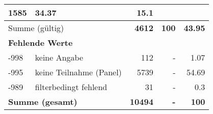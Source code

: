 \begin{longtable}{lXrrr}
       \num{1585} &
       \num[round-mode=places,round-precision=2]{34.37} &
         \num[round-mode=places,round-precision=2]{15.1} \\
     \midrule
     \multicolumn{2}{l}{Summe (gültig)} &
       \textbf{\num{4612}} &
     \textbf{\num{100}} &
       \textbf{\num[round-mode=places,round-precision=2]{43.95}} \\
     \multicolumn{5}{l}{\textbf{Fehlende Werte}}\\
       -998 &
       keine Angabe &
         \num{112} &
        - &
         \num[round-mode=places,round-precision=2]{1.07} \\
       -995 &
       keine Teilnahme (Panel) &
         \num{5739} &
        - &
         \num[round-mode=places,round-precision=2]{54.69} \\
       -989 &
       filterbedingt fehlend &
         \num{31} &
        - &
         \num[round-mode=places,round-precision=2]{0.3} \\
     \midrule
     \multicolumn{2}{l}{\textbf{Summe (gesamt)}} &
          \textbf{\num{10494}} &
        \textbf{-} &
        \textbf{\num{100}} \\
     \bottomrule
     \end{longtable}
     
